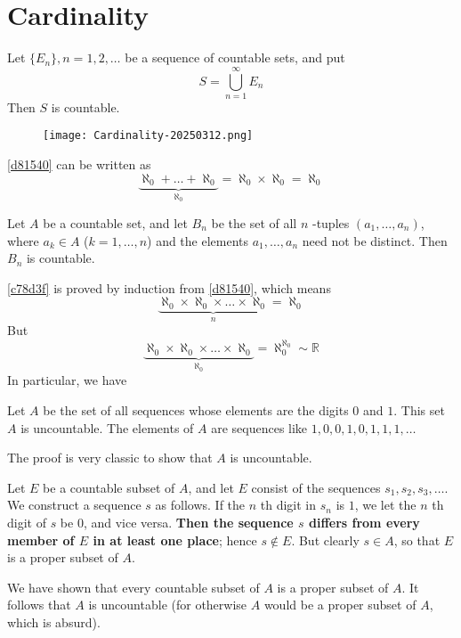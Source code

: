 \section{Cardinality}

\begin{theorem}
Let $\{ E_n \},n=1,2,\dots$ be a sequence of countable sets, and put
\[
S=\bigcup_{n=1}^{\infty} E_n
\]
Then $S$ is countable.\label{d81540}
\end{theorem}

\begin{figure}[H]
\centering
\texttt{[image: Cardinality-20250312.png]}
\label{}
\end{figure}

\cref{d81540} can be written as
\[
\underbrace{ \aleph_0+\dots+\aleph_0 }_{ \aleph_0 }=\aleph_0\times\aleph_0=\aleph_0
\]
\begin{theorem}
Let $A$ be a countable set, and let $B_n$ be the set of all $n$ -tuples $(a_1,\dots,a_n)$, where $a_k\in A$ ($k=1,\dots,n$) and the elements $a_1,\dots,a_n$ need not be distinct. Then $B_n$ is countable.\label{c78d3f}
\end{theorem}

\cref{c78d3f} is proved by induction from \cref{d81540}, which means
\[
\underbrace{ \aleph_0\times\aleph_0\times\dots \times\aleph_0 }_{ n }=\aleph_0
\]
But
\[
\underbrace{ \aleph_0\times\aleph_0\times\dots \times\aleph_0 }_{ \aleph_0 }=\aleph_0^{\aleph_0}\sim \mathbb{R}
\]
In particular, we have

\begin{theorem}
Let $A$ be the set of all sequences whose elements are the digits $0$ and $1$. This set $A$ is uncountable.
The elements of $A$ are sequences like $1,0,0,1,0,1,1,1,\dots$
\end{theorem}
The proof is very classic to show that $A$ is uncountable.

Let $E$ be a countable subset of $A$, and let $E$ consist of the sequences $s_1,s_2,s_3,\dots$. We construct a sequence $s$ as follows. If the $n$ th digit in $s_n$ is $1$, we let the $n$ th digit of $s$ be $0$, and vice versa. \textbf{Then the sequence $s$ differs from every member of $E$ in at least one place}; hence $s\not\in E$. But clearly $s\in A$, so that $E$ is a proper subset of $A$.

We have shown that every countable subset of $A$ is a proper subset of $A$. It follows that $A$ is uncountable (for otherwise $A$ would be a proper subset of $A$, which is absurd).

